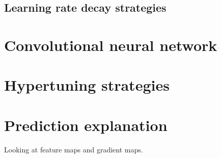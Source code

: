 \subsection{Learning rate decay strategies}
\section{Convolutional neural network}


\section{Hypertuning strategies}

\section{Prediction explanation}
Looking at feature maps and gradient maps.



